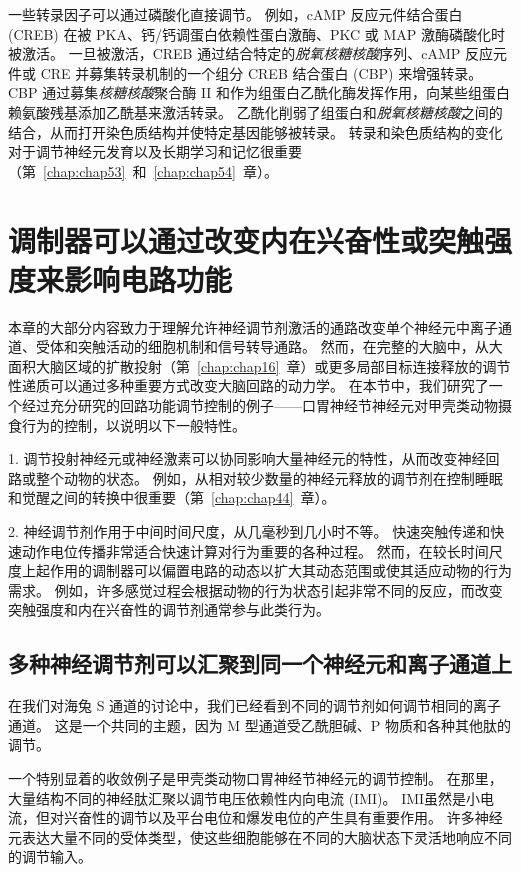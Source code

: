 一些转录因子可以通过磷酸化直接调节。
例如，cAMP 反应元件结合蛋白 (CREB) 在被 PKA、钙/钙调蛋白依赖性蛋白激酶、PKC 或 MAP 激酶磷酸化时被激活。
一旦被激活，CREB 通过结合特定的\textit{脱氧核糖核酸}序列、cAMP 反应元件或 CRE 并募集转录机制的一个组分 CREB 结合蛋白 (CBP) 来增强转录。
CBP 通过募集\textit{核糖核酸}聚合酶 II 和作为组蛋白乙酰化酶发挥作用，向某些组蛋白赖氨酸残基添加乙酰基来激活转录。
乙酰化削弱了组蛋白和\textit{脱氧核糖核酸}之间的结合，从而打开染色质结构并使特定基因能够被转录。
转录和染色质结构的变化对于调节神经元发育以及长期学习和记忆很重要（第~\ref{chap:chap53}~和~\ref{chap:chap54}~章）。



\section{调制器可以通过改变内在兴奋性或突触强度来影响电路功能}

本章的大部分内容致力于理解允许神经调节剂激活的通路改变单个神经元中离子通道、受体和突触活动的细胞机制和信号转导通路。
然而，在完整的大脑中，从大面积大脑区域的扩散投射（第~\ref{chap:chap16}~章）或更多局部目标连接释放的调节性递质可以通过多种重要方式改变大脑回路的动力学。
在本节中，我们研究了一个经过充分研究的回路功能调节控制的例子——口胃神经节神经元对甲壳类动物摄食行为的控制，以说明以下一般特性。


1. 调节投射神经元或神经激素可以协同影响大量神经元的特性，从而改变神经回路或整个动物的状态。
例如，从相对较少数量的神经元释放的调节剂在控制睡眠和觉醒之间的转换中很重要（第~\ref{chap:chap44}~章）。


2. 神经调节剂作用于中间时间尺度，从几毫秒到几小时不等。
快速突触传递和快速动作电位传播非常适合快速计算对行为重要的各种过程。
然而，在较长时间尺度上起作用的调制器可以偏置电路的动态以扩大其动态范围或使其适应动物的行为需求。
例如，许多感觉过程会根据动物的行为状态引起非常不同的反应，而改变突触强度和内在兴奋性的调节剂通常参与此类行为。



\subsection{多种神经调节剂可以汇聚到同一个神经元和离子通道上}

在我们对海兔 S 通道的讨论中，我们已经看到不同的调节剂如何调节相同的离子通道。
这是一个共同的主题，因为 M 型通道受乙酰胆碱、P 物质和各种其他肽的调节。


一个特别显着的收敛例子是甲壳类动物口胃神经节神经元的调节控制。
在那里，大量结构不同的神经肽汇聚以调节电压依赖性内向电流 (IMI)。
IMI虽然是小电流，但对兴奋性的调节以及平台电位和爆发电位的产生具有重要作用。
许多神经元表达大量不同的受体类型，使这些细胞能够在不同的大脑状态下灵活地响应不同的调节输入。


